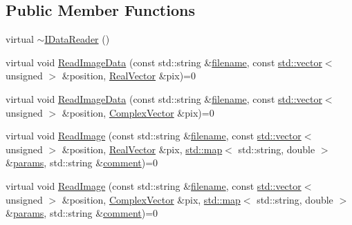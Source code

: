 \subsection*{Public Member Functions}
\begin{DoxyCompactItemize}
\item 
virtual \hyperlink{class_q_s_t_e_m_1_1_i_data_reader_a34aa1dcb98d18ae31766b9a20c9577c0}{$\sim$\-I\-Data\-Reader} ()
\item 
virtual void \hyperlink{class_q_s_t_e_m_1_1_i_data_reader_a4e15e1eb69872af78bd08630ef782f58}{Read\-Image\-Data} (const std\-::string \&\hyperlink{write_fields2_file_8m_af3723aa817dbb65282d5e1db81f08ad8}{filename}, const \hyperlink{qmb_8m_af54b69a32590de218622e869b06b47b3}{std\-::vector}$<$ unsigned $>$ \&position, \hyperlink{namespace_q_s_t_e_m_a8dfe9e1dbecce3838cb082d96e991ba7}{Real\-Vector} \&pix)=0
\item 
virtual void \hyperlink{class_q_s_t_e_m_1_1_i_data_reader_adc6556a1ee929a4878b59336818f7e12}{Read\-Image\-Data} (const std\-::string \&\hyperlink{write_fields2_file_8m_af3723aa817dbb65282d5e1db81f08ad8}{filename}, const \hyperlink{qmb_8m_af54b69a32590de218622e869b06b47b3}{std\-::vector}$<$ unsigned $>$ \&position, \hyperlink{namespace_q_s_t_e_m_af210a2c1f9afae1deed746dcd9276221}{Complex\-Vector} \&pix)=0
\item 
virtual void \hyperlink{class_q_s_t_e_m_1_1_i_data_reader_a85ec1dc94850698787b27da69016f729}{Read\-Image} (const std\-::string \&\hyperlink{write_fields2_file_8m_af3723aa817dbb65282d5e1db81f08ad8}{filename}, const \hyperlink{qmb_8m_af54b69a32590de218622e869b06b47b3}{std\-::vector}$<$ unsigned $>$ \&position, \hyperlink{namespace_q_s_t_e_m_a8dfe9e1dbecce3838cb082d96e991ba7}{Real\-Vector} \&pix, \hyperlink{_displacement_params_8m_af619c74fd72bdb64d115463dff2720cd}{std\-::map}$<$ std\-::string, double $>$ \&\hyperlink{image_sim_8m_ad57b218fb254a1624c09ad71cb6b6415}{params}, std\-::string \&\hyperlink{image_sim_8m_aea4cc4bd8e43a7f8ebf9b0ee3da8d681}{comment})=0
\item 
virtual void \hyperlink{class_q_s_t_e_m_1_1_i_data_reader_a5117abf48fcbd45a598d7119a6f75922}{Read\-Image} (const std\-::string \&\hyperlink{write_fields2_file_8m_af3723aa817dbb65282d5e1db81f08ad8}{filename}, const \hyperlink{qmb_8m_af54b69a32590de218622e869b06b47b3}{std\-::vector}$<$ unsigned $>$ \&position, \hyperlink{namespace_q_s_t_e_m_af210a2c1f9afae1deed746dcd9276221}{Complex\-Vector} \&pix, \hyperlink{_displacement_params_8m_af619c74fd72bdb64d115463dff2720cd}{std\-::map}$<$ std\-::string, double $>$ \&\hyperlink{image_sim_8m_ad57b218fb254a1624c09ad71cb6b6415}{params}, std\-::string \&\hyperlink{image_sim_8m_aea4cc4bd8e43a7f8ebf9b0ee3da8d681}{comment})=0

\end{DoxyCompactItemize}
